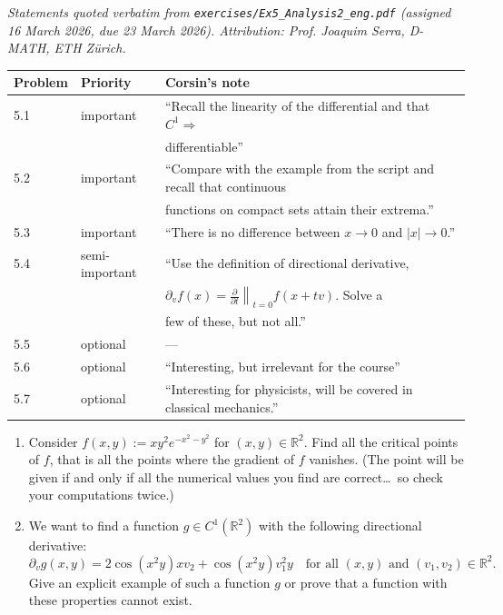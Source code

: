 
\textit{Statements quoted verbatim from \texttt{exercises/Ex5\_Analysis2\_eng.pdf} (assigned 16
March 2026, due 23 March 2026). Attribution: Prof. Joaquim Serra, D-MATH, ETH Z\"urich.}

\begin{notation}
\begin{center}
\begin{tabular}{lll}
\textbf{Problem} & \textbf{Priority} & \textbf{Corsin's note} \\
\hline
5.1 & important & ``Recall the linearity of the differential and that $C^1 \Rightarrow$ \\
    & & differentiable'' \\
5.2 & important & ``Compare with the example from the script and recall that continuous \\
    & & functions on compact sets attain their extrema.'' \\
5.3 & important & ``There is no difference between $x \to 0$ and $|x| \to 0$.'' \\
5.4 & semi-important & ``Use the definition of directional derivative, \\
    & & $\partial_v f(x) = \left.\frac{\partial}{\partial t}\right\|_{t=0} f(x+tv)$. Solve a \\
    & & few of these, but not all.'' \\
5.5 & optional & --- \\
5.6 & optional & ``Interesting, but irrelevant for the course'' \\
5.7 & optional & ``Interesting for physicists, will be covered in classical mechanics.'' \\
\end{tabular}
\end{center}
\end{notation}

\begin{exercise}
\label{ex:5.1}
\begin{enumerate}[label=\textbf{(\alph*)}]
  \item Consider $f(x,y) := xy^2e^{-x^2-y^2}$ for $(x,y) \in \mathbb{R}^2$. Find all the critical
    points of $f$, that is all the points where the gradient of $f$ vanishes. (The point will be
    given if and only if all the numerical values you find are correct\ldots\ so check your
    computations twice.)
  \item We want to find a function $g \in C^1(\mathbb{R}^2)$ with the following directional
    derivative:
    $$\partial_v g(x,y) = 2\cos(x^2y)xv_2 + \cos(x^2y)v_1^2y \quad \text{for all } (x,y) \text{ and } (v_1,v_2) \in \mathbb{R}^2.$$
    Give an explicit example of such a function $g$ or prove that a function with these
    properties cannot exist.
\end{enumerate}
\end{exercise}

